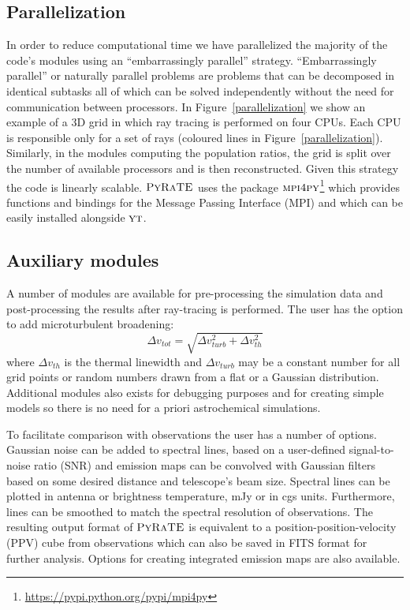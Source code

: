 \documentclass{mn2e}
\begin{document}
\subsection{Parallelization}\label{parallel}


In order to reduce computational time we have parallelized the majority of the code's modules using an ``embarrassingly parallel'' strategy. ``Embarrassingly parallel'' or naturally parallel problems are problems that can be decomposed in identical subtasks all of which can be solved independently without the need for communication between processors. In Figure~\ref{parallelization} we show an example of a 3D grid in which ray tracing is performed on four CPUs. Each CPU is responsible only for a set of rays (coloured lines in Figure~\ref{parallelization}). Similarly, in the modules computing the population ratios, the grid is split over the number of available processors and is then reconstructed. Given this strategy the code is linearly scalable. $\textsc{PyRaTE}$ uses the package $\textsc{mpi4py}$\footnote{\url{https://pypi.python.org/pypi/mpi4py}} which provides functions and bindings for the Message Passing Interface (MPI) and which can be easily installed alongside $\textsc{yt}$. 

\subsection{Auxiliary modules}

A number of modules are available for pre-processing the simulation data and post-processing the results after ray-tracing is performed. The user has the option to add microturbulent broadening:
\begin{equation}
\Delta v_{tot}=\sqrt{\Delta v_{turb}^2+\Delta v_{th}^2}
\end{equation}
where $\Delta v_{th}$ is the thermal linewidth and $\Delta v_{turb}$ may be a constant number for all grid points or random numbers drawn from a flat or a Gaussian distribution. Additional modules also exists for debugging purposes and for creating simple models so there is no need for a priori astrochemical simulations. 

To facilitate comparison with observations the user has a number of options. Gaussian noise can be added to spectral lines, based on a user-defined signal-to-noise ratio (SNR) and emission maps can be convolved with Gaussian filters based on some desired distance and telescope's beam size. Spectral lines can be plotted in antenna or brightness temperature, mJy or in cgs units. Furthermore, lines can be smoothed to match the spectral resolution of observations. The resulting output format of $\textsc{PyRaTE}$ is equivalent to a position-position-velocity (PPV) cube from observations which can also be saved in FITS format for further analysis. Options for creating integrated emission maps are also available. 
\end{document}
